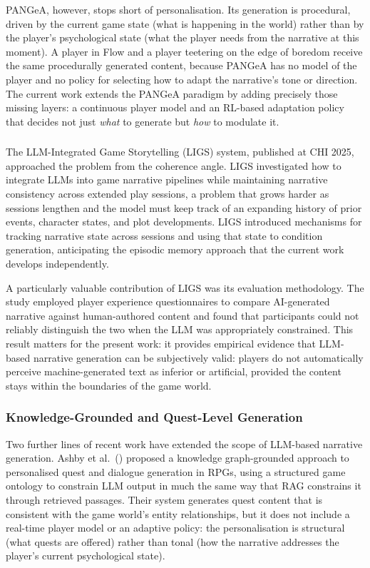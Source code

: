 PANGeA, however, stops short of personalisation. Its generation is procedural, driven by the current game state (what is happening in the world) rather than by the player's psychological state (what the player needs from the narrative at this moment). A player in Flow and a player teetering on the edge of boredom receive the same procedurally generated content, because PANGeA has no model of the player and no policy for selecting how to adapt the narrative's tone or direction. The current work extends the PANGeA paradigm by adding precisely those missing layers: a continuous player model and an RL-based adaptation policy that decides not just \textit{what} to generate but \textit{how} to modulate it.

\subsubsection{\citet{ligs2025chi}}

The LLM-Integrated Game Storytelling (LIGS) system, published at CHI 2025, approached the problem from the coherence angle. LIGS investigated how to integrate LLMs into game narrative pipelines while maintaining narrative consistency across extended play sessions, a problem that grows harder as sessions lengthen and the model must keep track of an expanding history of prior events, character states, and plot developments. LIGS introduced mechanisms for tracking narrative state across sessions and using that state to condition generation, anticipating the episodic memory approach that the current work develops independently.

A particularly valuable contribution of LIGS was its evaluation methodology. The study employed player experience questionnaires to compare AI-generated narrative against human-authored content and found that participants could not reliably distinguish the two when the LLM was appropriately constrained. This result matters for the present work: it provides empirical evidence that LLM-based narrative generation can be subjectively valid: players do not automatically perceive machine-generated text as inferior or artificial, provided the content stays within the boundaries of the game world.

\subsubsection{Knowledge-Grounded and Quest-Level Generation}

Two further lines of recent work have extended the scope of LLM-based narrative generation. Ashby et al.\ (\citeyear{ashby2023personalized}) proposed a knowledge graph-grounded approach to personalised quest and dialogue generation in RPGs, using a structured game ontology to constrain LLM output in much the same way that RAG constrains it through retrieved passages. Their system generates quest content that is consistent with the game world's entity relationships, but it does not include a real-time player model or an adaptive policy: the personalisation is structural (what quests are offered) rather than tonal (how the narrative addresses the player's current psychological state).

